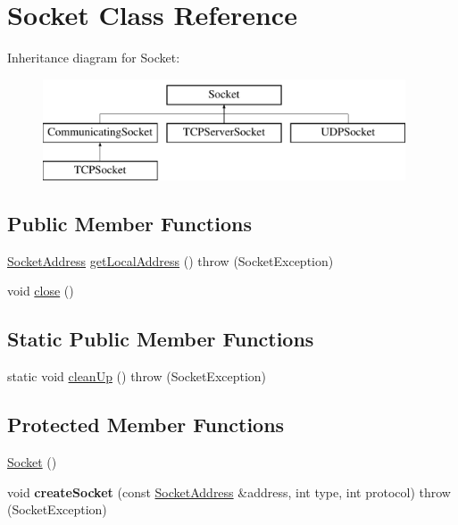 \hypertarget{class_socket}{}\section{Socket Class Reference}
\label{class_socket}
Inheritance diagram for Socket\+:\begin{figure}[H]
\begin{center}
\leavevmode
\includegraphics[height=3.000000cm]{class_socket}
\end{center}
\end{figure}
\subsection*{Public Member Functions}
\begin{DoxyCompactItemize}
\item 
\hyperlink{class_socket_address}{Socket\+Address} \hyperlink{class_socket_a49cc7d2d47c3e4d85dc7149de09ad7a0}{get\+Local\+Address} ()  throw (\+Socket\+Exception)
\item 
void \hyperlink{class_socket_a75ee749264ccbcfc4dfbf5442e55dcb8}{close} ()
\end{DoxyCompactItemize}
\subsection*{Static Public Member Functions}
\begin{DoxyCompactItemize}
\item 
static void \hyperlink{class_socket_ac5060aeb501044044351d5a85b3fc95f}{clean\+Up} ()  throw (\+Socket\+Exception)
\end{DoxyCompactItemize}
\subsection*{Protected Member Functions}
\begin{DoxyCompactItemize}
\item 
\hyperlink{class_socket_a7c3256c4fc6e2c603df73201049fae5a}{Socket} ()
\item 
void {\bfseries create\+Socket} (const \hyperlink{class_socket_address}{Socket\+Address} \&address, int type, int protocol)  throw (\+Socket\+Exception)\hypertarget{class_socket_abb9c69d4f07192d6204b645e74c7c0f6}{}\label{class_socket_abb9c69d4f07192d6204b645e74c7c0f6}

\end{DoxyCompactItemize}
